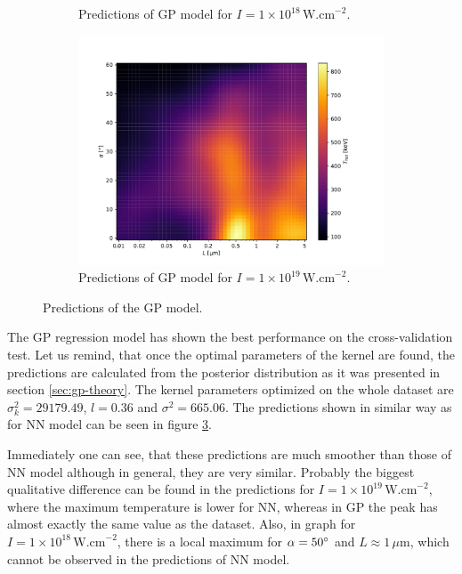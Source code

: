 \begin{figure}[ht]
\begin{subfigure}{0.49\textwidth}
		\caption{Predictions of GP model for $I = 1 \times 10^{18} \, \mathrm{W.cm}^{-2}$.}
		\label{fig:gp-pred-b}
	\end{subfigure}
	\begin{subfigure}{0.49\textwidth}
		\centering
		\includegraphics[width=\textwidth]{figures/gp19_pred}
		\caption{Predictions of GP model for $I = 1 \times 10^{19} \, \mathrm{W.cm}^{-2}$.}
		\label{fig:gp-pred-c}
	\end{subfigure}
	\caption{Predictions of the GP model.}
	\label{fig:gp-pred}
\end{figure}

The GP regression model has shown the best performance on the cross-validation test. Let us remind, that once the optimal parameters of the kernel are found, the predictions are calculated from the posterior distribution as it was presented in section \ref{sec:gp-theory}. The kernel parameters optimized on the whole dataset are $\sigma_k^2 =29179.49$, $l = 0.36$ and $\sigma^2 = 665.06$. The predictions shown in similar way as for NN model can be seen in figure \ref{fig:gp-pred}.

Immediately one can see, that these predictions are much smoother than those of NN model although in general, they are very similar. Probably the biggest qualitative difference can be found in the predictions for $I = 1 \times 10^{19} \, \mathrm{W.cm}^{-2}$, where the maximum temperature is lower for NN, whereas in GP the peak has almost exactly the same value as the dataset. Also, in graph for $I = 1 \times 10^{18} \, \mathrm{W.cm}^{-2}$, there is a local maximum for $\alpha = 50\degree$ and $L \approx 1 \, \mu\mathrm{m}$, which cannot be observed in the predictions of NN model.

